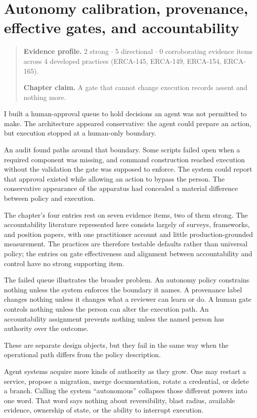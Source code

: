 \chapter{Autonomy calibration, provenance, effective gates, and accountability}
\label{ch16-autonomy-provenance-gates-accountability}
\begin{quote}
\textbf{Evidence profile.} 2 strong \(\cdot\) 5 directional \(\cdot\) 0 corroborating evidence items across 4 developed practices (ERCA-145, ERCA-149, ERCA-154, ERCA-165).

\textbf{Chapter claim.} A gate that cannot change execution records assent and nothing more.
\end{quote}

I built a human-approval queue to hold decisions an agent was not permitted to make. The architecture appeared conservative: the agent could prepare an action, but execution stopped at a human-only boundary.

An audit found paths around that boundary. Some scripts failed open when a required component was missing, and command construction reached execution without the validation the gate was supposed to enforce. The system could report that approval existed while allowing an action to bypass the person. The conservative appearance of the apparatus had concealed a material difference between policy and execution.

The chapter's four entries rest on seven evidence items, two of them strong. The accountability literature represented here consists largely of surveys, frameworks, and position papers, with one practitioner account and little production-grounded measurement. The practices are therefore testable defaults rather than universal policy; the entries on gate effectiveness and alignment between accountability and control have no strong supporting item.

The failed queue illustrates the broader problem. An autonomy policy constrains nothing unless the system enforces the boundary it names. A provenance label changes nothing unless it changes what a reviewer can learn or do. A human gate controls nothing unless the person can alter the execution path. An accountability assignment prevents nothing unless the named person has authority over the outcome.

These are separate design objects, but they fail in the same way when the operational path differs from the policy description.

Agent systems acquire more kinds of authority as they grow. One may restart a service, propose a migration, merge documentation, rotate a credential, or delete a branch. Calling the system ``autonomous'' collapses those different powers into one word. That word says nothing about reversibility, blast radius, available evidence, ownership of state, or the ability to interrupt execution.

